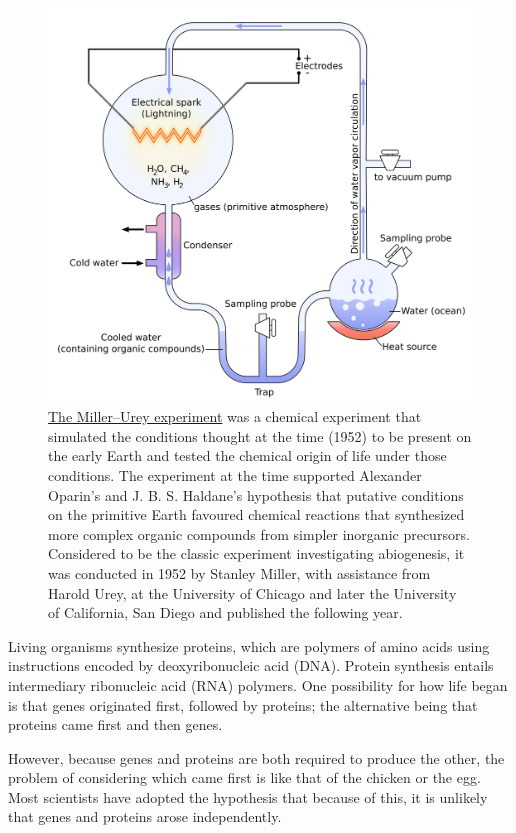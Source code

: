 \begin{figure}

{\centering \includegraphics[width=0.7\linewidth]{./figures/life/Miller-Urey_experiment-en} 

}

\caption{\href{https://commons.wikimedia.org/wiki/File:MUexperiment.png}{The Miller--Urey experiment} was a chemical experiment that simulated the conditions thought at the time (1952) to be present on the early Earth and tested the chemical origin of life under those conditions. The experiment at the time supported Alexander Oparin's and J. B. S. Haldane's hypothesis that putative conditions on the primitive Earth favoured chemical reactions that synthesized more complex organic compounds from simpler inorganic precursors. Considered to be the classic experiment investigating abiogenesis, it was conducted in 1952 by Stanley Miller, with assistance from Harold Urey, at the University of Chicago and later the University of California, San Diego and published the following year.}\label{fig:millerurey}
\end{figure}

Living organisms synthesize proteins, which are polymers of amino acids using instructions encoded by deoxyribonucleic acid (DNA). Protein synthesis entails intermediary ribonucleic acid (RNA) polymers. One possibility for how life began is that genes originated first, followed by proteins; the alternative being that proteins came first and then genes.

However, because genes and proteins are both required to produce the other, the problem of considering which came first is like that of the chicken or the egg. Most scientists have adopted the hypothesis that because of this, it is unlikely that genes and proteins arose independently.

